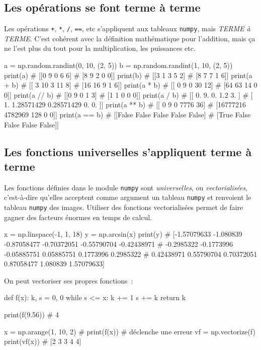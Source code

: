 \documentclass[10pt,fleqn]{article} %
\begin{document}
\subsection{Les opérations se font terme à terme}
\label{operations}
Les opérations \texttt{+}, \texttt{*}, \texttt{/}, \texttt{==}, etc s'appliquent aux tableaux
\texttt{numpy}, mais \emph{TERME à TERME}. C'est cohérent avec la
définition mathématique pour l'addition, mais ça ne l'est plus du tout
pour la multiplication, les puissances etc.
\begin{py}
\begin{multicols}{2}
\begin{python}
a = np.random.randint(0, 10, (2, 5))
b = np.random.randint(1, 10, (2, 5))
print(a)
# [[0 9 0 6 6]
#  [8 9 2 0 0]]
print(b)
# [[3 1 3 5 2]
#  [8 7 7 1 6]]
print(a + b)
# [[ 3 10  3 11  8]
#  [16 16  9  1  6]]
print(a * b)
# [[ 0  9  0 30 12]
#  [64 63 14  0  0]]
print(a // b)
# [[0 9 0 1 3]
#  [1 1 0 0 0]]
print(a / b)
# [[ 0.          9.          0.          1.2         3.        ]
#  [ 1.          1.28571429  0.28571429  0.          0.        ]]
print(a ** b)
# [[       0        9        0     7776       36]
#  [16777216  4782969      128        0        0]]  
print(a == b)
# [[False False False False False]
#  [True False False False False]]
\end{python}
\end{multicols}
\end{py}

\subsection{Les fonctions universelles s'appliquent terme à terme}
Les fonctions définies dans le module \texttt{numpy} sont
\emph{universelles}, ou \emph{vectorialisées}, c'est-à-dire qu'elles acceptent comme argument un
tableau \texttt{numpy} et renvoient le tableau \texttt{numpy} des
images. Utiliser des fonctions vectorialisées permet de faire gagner
des facteurs énormes en temps de calcul.

\begin{python}
x = np.linspace(-1, 1, 18)
y = np.arcsin(x)
print(y)
# [-1.57079633 -1.080839   -0.87058477 -0.70372051 -0.55790704 -0.42438971
#  -0.2985322  -0.1773996  -0.05885751  0.05885751  0.1773996   0.2985322
#   0.42438971  0.55790704  0.70372051  0.87058477  1.080839    1.57079633]  
\end{python}

On peut vectoriser ses propres fonctions~:
\begin{python}
def f(x):
    k, s = 0, 0
    while s <= x:
        k += 1
        s += k
    return k

print(f(9.56))
# 4

x = np.arange(1, 10, 2)
# print(f(x)) # déclenche une erreur
vf = np.vectorize(f)
print(vf(x))
# [2 3 3 4 4]  
\end{python}
\end{document}
